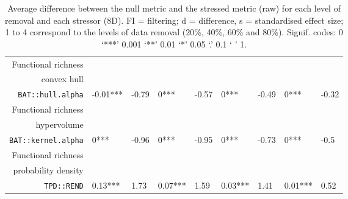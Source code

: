 \begin{table}[ht]
\begin{tabular}{rllllllll}
  Functional richness\\convex hull\\\texttt{BAT::hull.alpha} & -0.01*** & -0.79 & 0*** & -0.57 & 0*** & -0.49 & 0*** & -0.32 \\ 
  Functional richness\\hypervolume\\\texttt{BAT::kernel.alpha} & 0*** & -0.96 & 0*** & -0.95 & 0*** & -0.73 & 0*** & -0.5 \\ 
  Functional richness\\probability density\\\texttt{TPD::REND} & 0.13*** & 1.73 & 0.07*** & 1.59 & 0.03*** & 1.41 & 0.01*** & 0.52 \\ 
   \hline
\end{tabular}
\caption{Average difference between the null metric and the stressed metric (raw) for each level of removal and each stressor (8D). FI = filtering; d = difference, s = standardised effect size; 1 to 4 correspond to the levels of data removal (20\%, 40\%, 60\% and 80\%). Signif. codes:  0 ‘***’ 0.001 ‘**’ 0.01 ‘*’ 0.05 ‘.’ 0.1 ‘ ’ 1.} 
\end{table}
